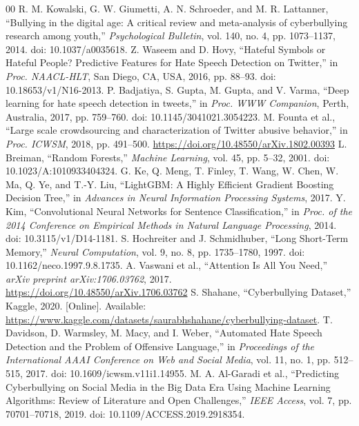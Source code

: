 \begin{thebibliography}{00}
 R. M. Kowalski, G. W. Giumetti, A. N. Schroeder, and M. R. Lattanner, ``Bullying in the digital age: A critical review and meta-analysis of cyberbullying research among youth,'' \textit{Psychological Bulletin}, vol. 140, no. 4, pp. 1073--1137, 2014. doi: 10.1037/a0035618.
 Z. Waseem and D. Hovy, ``Hateful Symbols or Hateful People? Predictive Features for Hate Speech Detection on Twitter,'' in \textit{Proc. NAACL-HLT}, San Diego, CA, USA, 2016, pp. 88--93. doi: 10.18653/v1/N16-2013.
 P. Badjatiya, S. Gupta, M. Gupta, and V. Varma, ``Deep learning for hate speech detection in tweets,'' in \textit{Proc. WWW Companion}, Perth, Australia, 2017, pp. 759--760. doi: 10.1145/3041021.3054223.
 M. Founta et al., ``Large scale crowdsourcing and characterization of Twitter abusive behavior,'' in \textit{Proc. ICWSM}, 2018, pp. 491--500. \url{https://doi.org/10.48550/arXiv.1802.00393}
 L. Breiman, ``Random Forests,'' \textit{Machine Learning}, vol. 45, pp. 5--32, 2001. doi: 10.1023/A:1010933404324.
 G. Ke, Q. Meng, T. Finley, T. Wang, W. Chen, W. Ma, Q. Ye, and T.-Y. Liu, ``LightGBM: A Highly Efficient Gradient Boosting Decision Tree,'' in \textit{Advances in Neural Information Processing Systems}, 2017.
 Y. Kim, ``Convolutional Neural Networks for Sentence Classification,'' in \textit{Proc. of the 2014 Conference on Empirical Methods in Natural Language Processing}, 2014. doi: 10.3115/v1/D14-1181.
 S. Hochreiter and J. Schmidhuber, ``Long Short-Term Memory,'' \textit{Neural Computation}, vol. 9, no. 8, pp. 1735--1780, 1997. doi: 10.1162/neco.1997.9.8.1735.
 A. Vaswani et al., ``Attention Is All You Need,'' \textit{arXiv preprint arXiv:1706.03762}, 2017. \url{https://doi.org/10.48550/arXiv.1706.03762}
 S. Shahane, ``Cyberbullying Dataset,'' Kaggle, 2020. [Online]. Available: \url{https://www.kaggle.com/datasets/saurabhshahane/cyberbullying-dataset}.  
 T. Davidson, D. Warmsley, M. Macy, and I. Weber, ``Automated Hate Speech Detection and the Problem of Offensive Language,'' in \textit{Proceedings of the International AAAI Conference on Web and Social Media}, vol. 11, no. 1, pp. 512--515, 2017. doi: 10.1609/icwsm.v11i1.14955.
 M. A. Al-Garadi et al., ``Predicting Cyberbullying on Social Media in the Big Data Era Using Machine Learning Algorithms: Review of Literature and Open Challenges,'' \textit{IEEE Access}, vol. 7, pp. 70701--70718, 2019. doi: 10.1109/ACCESS.2019.2918354.

\end{thebibliography}
